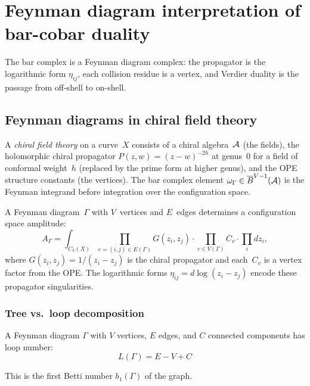 \chapter{Feynman diagram interpretation of bar-cobar duality}
\label{ch:feynman}

The bar complex is a Feynman diagram complex: the propagator is the logarithmic form $\eta_{ij}$, each collision residue is a vertex, and Verdier duality is the passage from off-shell to on-shell.


\section{Feynman diagrams in chiral field theory}

\begin{definition}
\label{def:worldline-intro}
A \emph{chiral field theory} on a curve~$X$ consists of a chiral
algebra~$\mathcal{A}$ (the fields), the holomorphic chiral propagator
$P(z,w) = (z-w)^{-2h}$ at genus~$0$ for a field of conformal
weight~$h$ (replaced by the prime form at higher genus), and the
OPE structure constants (the vertices).  The bar complex element
$\omega_\Gamma \in \overline{B}^{V-1}(\mathcal{A})$ is the Feynman integrand
before integration over the configuration space.

A Feynman diagram~$\Gamma$ with $V$~vertices and $E$~edges
determines a configuration space amplitude:
\[
A_\Gamma = \int_{C_V(X)}
\prod_{e=(i,j) \in E(\Gamma)} G(z_i,z_j)
\cdot \prod_{v \in V(\Gamma)} C_v
\cdot \prod_i dz_i,
\]
where $G(z_i,z_j) = 1/(z_i - z_j)$ is the chiral propagator and
each~$C_v$ is a vertex factor from the OPE.  The logarithmic forms
$\eta_{ij} = d\log(z_i-z_j)$ encode these propagator singularities.
\end{definition}

\subsection{Tree vs.\ loop decomposition}

\begin{definition}
A Feynman diagram $\Gamma$ with $V$ vertices, $E$ edges, and $C$ connected 
components has loop number:
\[L(\Gamma) = E - V + C\]

This is the first Betti number $b_1(\Gamma)$ of the graph.
\end{definition}

